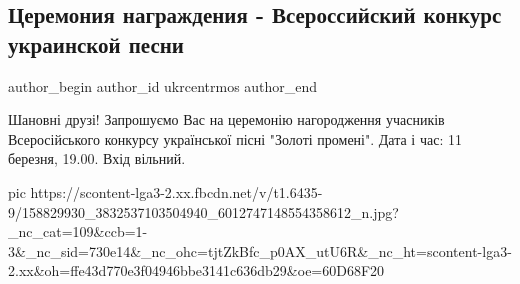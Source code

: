 
 
 
 
 
 
\subsection{Церемония награждения - Всероссийский конкурс украинской песни}
\label{sec:09_03_2021.fb.ukrcentrmos.1.konkurs_nagrazhdenie}
\ifcmt
 author_begin
   author_id ukrcentrmos
 author_end
\fi

\obeycr
Шановні друзі!
Запрошуємо Вас на церемонію нагородження учасників Всеросійського конкурсу української пісні "Золоті промені".
Дата і час: 11 березня, 19.00.
Вхід вільний.
\restorecr

\ifcmt
  pic https://scontent-lga3-2.xx.fbcdn.net/v/t1.6435-9/158829930_3832537103504940_6012747148554358612_n.jpg?_nc_cat=109&ccb=1-3&_nc_sid=730e14&_nc_ohc=tjtZkBfc_p0AX_utU6R&_nc_ht=scontent-lga3-2.xx&oh=ffe43d770e3f04946bbe3141c636db29&oe=60D68F20
\fi
